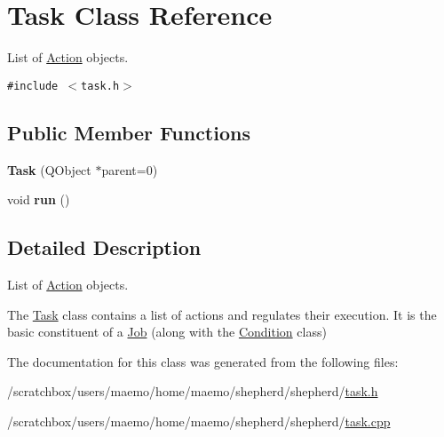 \hypertarget{class_task}{
\section{Task Class Reference}
\label{class_task}
}
List of \hyperlink{interface_action}{Action} objects.  


{\tt \#include $<$task.h$>$}

\subsection*{Public Member Functions}
\begin{CompactItemize}
\item 
\hypertarget{class_task_735ce7d6c4f28172d8d6493541cc91e7}{
\textbf{Task} (QObject $\ast$parent=0)}
\label{class_task_735ce7d6c4f28172d8d6493541cc91e7}

\item 
\hypertarget{class_task_034b41e0d81a3dc01804bbc3f73a25f2}{
void \textbf{run} ()}
\label{class_task_034b41e0d81a3dc01804bbc3f73a25f2}

\end{CompactItemize}


\subsection{Detailed Description}
List of \hyperlink{interface_action}{Action} objects. 

The \hyperlink{class_task}{Task} class contains a list of actions and regulates their execution. It is the basic constituent of a \hyperlink{class_job}{Job} (along with the \hyperlink{class_condition}{Condition} class) 

The documentation for this class was generated from the following files:\begin{CompactItemize}
\item 
/scratchbox/users/maemo/home/maemo/shepherd/shepherd/\hyperlink{task_8h}{task.h}\item 
/scratchbox/users/maemo/home/maemo/shepherd/shepherd/\hyperlink{task_8cpp}{task.cpp}\end{CompactItemize}
